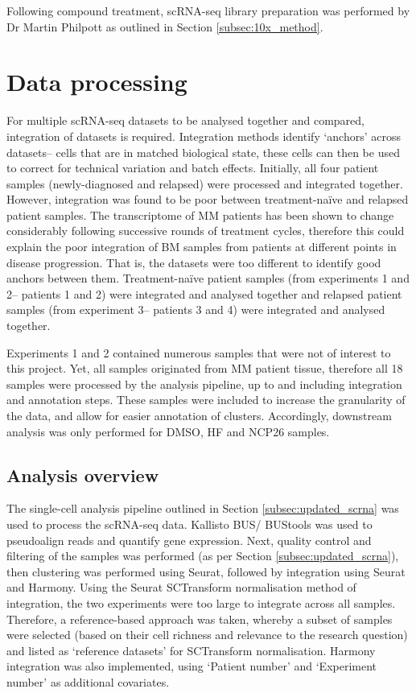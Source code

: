 Following compound treatment, scRNA-seq library preparation was performed by Dr Martin Philpott as outlined in Section \ref{subsec:10x_method}.


\section{Data processing}
For multiple scRNA-seq datasets to be analysed together and compared, integration of datasets is required.
Integration methods identify `anchors' across datasets-- cells that are in matched biological state, these cells can then be used to correct for technical variation and batch effects.
Initially, all four patient samples (newly-diagnosed and relapsed) were processed and integrated together.
However, integration was found to be poor between treatment-na\"ive and relapsed patient samples.
The transcriptome of MM patients has been shown to change considerably following successive rounds of treatment cycles, therefore this could explain the poor integration of BM samples from patients at different points in disease progression.
That is, the datasets were too different to identify good anchors between them.
Treatment-na\"ive patient samples (from experiments 1 and 2-- patients 1 and 2) were integrated and analysed together and relapsed patient samples (from experiment 3-- patients 3 and 4) were integrated and analysed together.

Experiments 1 and 2 contained numerous samples that were not of interest to this project.
Yet, all samples originated from MM patient tissue, therefore all 18 samples were processed by the analysis pipeline, up to and including integration and annotation steps.
These samples were included to increase the granularity of the data, and allow for easier annotation of clusters.
Accordingly, downstream analysis was only performed for DMSO, HF and NCP26 samples.

\subsection{Analysis overview}

The single-cell analysis pipeline outlined in Section \ref{subsec:updated_scrna} was used to process the scRNA-seq data.
Kallisto BUS/ BUStools was used to pseudoalign reads and quantify gene expression.
Next, quality control and filtering of the samples was performed (as per Section \ref{subsec:updated_scrna}), then clustering was performed using Seurat, followed by integration using Seurat and Harmony.
Using the Seurat SCTransform normalisation method of integration, the two experiments were too large to integrate across all samples.
Therefore, a reference-based approach was taken, whereby a subset of samples were selected (based on their cell richness and relevance to the research question) and listed as `reference datasets' for SCTransform normalisation.
Harmony integration was also implemented, using `Patient number' and `Experiment number' as additional covariates.

